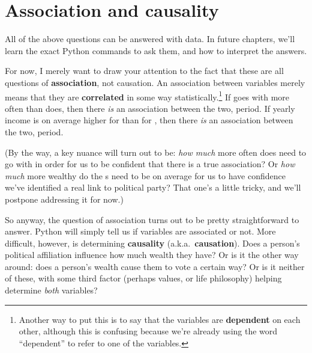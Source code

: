 \section{Association and causality}

\label{association}

All of the above questions can be answered with data. In future chapters, we'll
learn the exact Python commands to ask them, and how to interpret the answers.


For now, I merely want to draw your attention to the fact that these are all
questions of \textbf{association}, not causation. An association between
variables merely means that they are \textbf{correlated} in some way
statistically.\footnote{Another way to put this is to say that the variables
are \textbf{dependent} on each other, although this is confusing because we're
already using the word ``dependent'' to refer to one of the variables.} If
 goes with  more often than
 does, then there \textit{is} an association between the
two, period. If yearly income  is on average higher for
 than for , then there \textit{is}
an association between the two, period.

\label{howMuchMore}

(By the way, a key nuance will turn out to be: \textit{how much} more often
does  need to go with  in order for us to
be confident that there is a true association? Or \textit{how much} more
wealthy do the s need to be on average for us to have
confidence we've identified a real link to political party? That one's a little
tricky, and we'll postpone addressing it for now.)

\label{pythonAssociation}

So anyway, the question of association turns out to be pretty straightforward
to answer. Python will simply tell us if variables are associated or not. More
difficult, however, is determining \textbf{causality}
(a.k.a.~\textbf{causation}). Does a person's political affiliation influence
how much wealth they have? Or is it the other way around: does a person's
wealth cause them to vote a certain way? Or is it neither of these, with some
third factor (perhaps values, or life philosophy) helping determine
\textit{both} variables?

